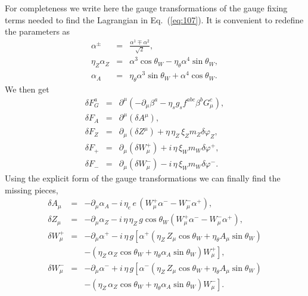 \documentclass{ws-ijmpa}
\begin{document}
For completeness we write here the gauge transformations of the gauge
fixing terms needed to find the Lagrangian in Eq.~(\ref{eq:107}).
It is convenient to redefine the parameters as
%
\begin{eqnarray}
\alpha^\pm &=&
\frac{\alpha^1 \mp \alpha^2}{\sqrt{2}} ,
\nonumber\\[+2mm]
\eta_Z \alpha_Z &=&
\alpha^3 \cos\theta_W -\eta_{\theta} \alpha^4 \sin\theta_W ,
\nonumber\\[+2mm]
\alpha_A &=&
\eta_{\theta} \alpha^3 \sin\theta_W + \alpha^4 \cos\theta_W .
\end{eqnarray}
%
We then get
%
\begin{eqnarray}
\delta F_G^a
&=&
\partial^\mu\left(
- \partial_\mu \beta^a - \eta_s g_s f^{abc} \beta^b G_\mu^c\right) ,
\nonumber\\[+2mm]
\delta F_A
&=&
\partial^\mu(\delta A^\mu) ,
\nonumber\\[+2mm]
\delta F_Z
&=&
\partial_\mu (\delta Z^\mu)  + \eta\,\eta_Z\,\xi_Z m_Z \delta \varphi_Z ,
\nonumber\\[+2mm]
\delta F_{+}
&=& \partial_\mu (\delta W_\mu^+ ) + i\,\eta\, \xi_W m_W \delta \varphi^+  ,
\nonumber\\[+2mm]
\delta F_{-}
&=&
\partial_\mu (\delta W_\mu^- ) - i\,\eta\, \xi_W m_W \delta \varphi^- .
\label{eq:110}
\end{eqnarray}
%
Using the explicit form of the gauge transformations we can finally
find the missing pieces,
%
\begin{eqnarray}
\delta A_\mu
&=&
-\partial_\mu \alpha_A -i\,\eta_e\, e\,
\left(W_\mu^+ \alpha^- - W_\mu^- \alpha^+ \right) ,
\nonumber\\[+2mm]
\delta Z_\mu
&=&
-\partial_\mu \alpha_Z - i\,\eta\,\eta_Z\, g \cos\theta_W 
\left( W_\mu^+ \alpha^- - W_\mu^- \alpha^+ \right)  ,
\nonumber\\[+2mm]
\delta W_\mu^+
&=&
-\partial_\mu \alpha^+ - i\,\eta\, g 
\left[ \alpha^+ \left(\eta_Z\, Z_\mu \cos\theta_W 
+ \eta_{\theta}A_\mu \sin\theta_W \right)
\right.
\nonumber\\[+2mm]
& &
\left.
  - \left( \eta_Z\, \alpha_Z \cos\theta_W 
+\eta_{\theta} \alpha_A \sin\theta_W \right)  W_\mu^+
  \right] ,
\nonumber\\[+2mm]
\delta W_\mu^-
&=&
-\partial_\mu \alpha^- + i\,\eta\,  g 
\left[ \alpha^- \left(\eta_Z\,Z_\mu \cos\theta_W 
+ \eta_{\theta}A_\mu \sin\theta_W \right)
\right.
\nonumber\\[+2mm]
& &
\left.
  - \left( \eta_Z\,\alpha_Z \cos\theta_W 
+ \eta_{\theta}\alpha_A \sin\theta_W \right)  W_\mu^-
  \right].
\label{eq:111}
\end{eqnarray}
\end{document}

